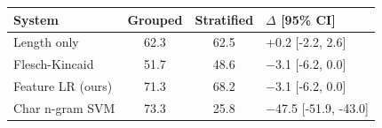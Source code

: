 \begin{tabular}{lccl}
\toprule
System & Grouped & Stratified & $\Delta$ [95\% CI] \\
\midrule
Length only & 62.3 & 62.5 & +0.2 [-2.2, 2.6] \\
Flesch-Kincaid & 51.7 & 48.6 & $-$3.1 [-6.2, 0.0] \\
Feature LR (ours) & 71.3 & 68.2 & $-$3.1 [-6.2, 0.0] \\
Char n-gram SVM & 73.3 & 25.8 & $-$47.5 [-51.9, -43.0] \\
\bottomrule
\end{tabular}
